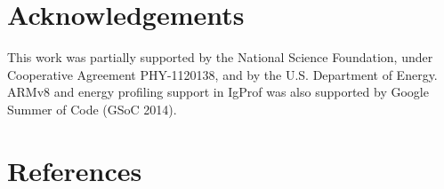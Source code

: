 \section*{Acknowledgements}
This work was partially supported by the National Science Foundation,
under Cooperative Agreement PHY-1120138, and by the U.S. Department
of Energy. ARMv8 and energy profiling support in IgProf was also 
supported by Google Summer of Code (GSoC 2014).

\section*{References}



